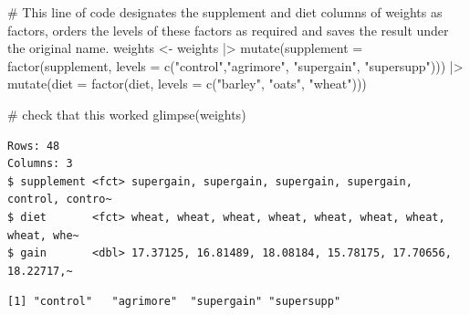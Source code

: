 \documentclass[
  letterpaper,
  DIV=11,
  numbers=noendperiod]{scrreprt}
\newenvironment{Shaded}{\begin{snugshade}}{\end{snugshade}}
\newcommand{\AttributeTok}[1]{\textcolor[rgb]{0.40,0.45,0.13}{#1}}
\newcommand{\CommentTok}[1]{\textcolor[rgb]{0.37,0.37,0.37}{#1}}
\newcommand{\FunctionTok}[1]{\textcolor[rgb]{0.28,0.35,0.67}{#1}}
\newcommand{\NormalTok}[1]{\textcolor[rgb]{0.00,0.23,0.31}{#1}}
\newcommand{\OtherTok}[1]{\textcolor[rgb]{0.00,0.23,0.31}{#1}}
\newcommand{\SpecialCharTok}[1]{\textcolor[rgb]{0.37,0.37,0.37}{#1}}
\newcommand{\StringTok}[1]{\textcolor[rgb]{0.13,0.47,0.30}{#1}}
\begin{document}
\begin{Shaded}
\begin{Highlighting}[]
\CommentTok{\# This line of code designates the supplement and diet columns of weights as factors, orders the levels of these factors as required and saves the result under the original name.}
\NormalTok{weights }\OtherTok{\textless{}{-}}\NormalTok{ weights }\SpecialCharTok{|\textgreater{}}
  \FunctionTok{mutate}\NormalTok{(}\AttributeTok{supplement =} \FunctionTok{factor}\NormalTok{(supplement, }\AttributeTok{levels =} \FunctionTok{c}\NormalTok{(}\StringTok{"control"}\NormalTok{,}\StringTok{"agrimore"}\NormalTok{, }\StringTok{"supergain"}\NormalTok{, }\StringTok{"supersupp"}\NormalTok{))) }\SpecialCharTok{|\textgreater{}}
  \FunctionTok{mutate}\NormalTok{(}\AttributeTok{diet =} \FunctionTok{factor}\NormalTok{(diet, }\AttributeTok{levels =} \FunctionTok{c}\NormalTok{(}\StringTok{"barley"}\NormalTok{, }\StringTok{"oats"}\NormalTok{, }\StringTok{"wheat"}\NormalTok{)))}

\CommentTok{\# check that this worked}
\FunctionTok{glimpse}\NormalTok{(weights)}
\end{Highlighting}
\end{Shaded}

\begin{verbatim}
Rows: 48
Columns: 3
$ supplement <fct> supergain, supergain, supergain, supergain, control, contro~
$ diet       <fct> wheat, wheat, wheat, wheat, wheat, wheat, wheat, wheat, whe~
$ gain       <dbl> 17.37125, 16.81489, 18.08184, 15.78175, 17.70656, 18.22717,~
\end{verbatim}

\begin{Shaded}
\end{Shaded}

\begin{verbatim}
[1] "control"   "agrimore"  "supergain" "supersupp"
\end{verbatim}

\begin{Shaded}
\end{Shaded}
\end{document}
